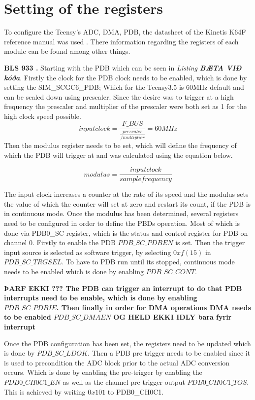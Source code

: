 \chapter{Setting of the registers}\label{sec:codeExplain}
To configure the Teensy's ADC, DMA, PDB, the datasheet of the Kinetis K64F reference manual was used \cite{freescale_semiconductor_kinetis_2021}.
There information regarding the registers of each module can be found among other things.

\textbf{BLS 933 \cite{freescale_semiconductor_kinetis_2021}.}
Starting with the PDB  which can be seen in \textit{Listing \textbf{BÆTA VIÐ kóða}}.
Firstly the clock for the PDB clock needs to be enabled, which is done by setting the SIM\_SCGC6\_PDB;
Which for the Teensy3.5 is 60MHz default and can be scaled down using prescaler.
Since the desire was to trigger at a high frequency the prescaler and multiplier of the prescaler were both set as 1 for the high clock speed possible.
\textbf{$$input clock = \frac{F\_BUS}{\frac{prescaler}{/multiplier}} = 60MHz$$}
Then the modulus register needs to be set, which will define the frequency of which the PDB will trigger at and was calculated using the equation below.

$$modulus = \frac{input clock}{sample frequency}$$

The input clock increases a counter at the rate of its speed and the modulus sets the value of which the counter will set at zero and restart its count, if the PDB is in continuous mode.
Once the modulus has been determined, several registers need to be configured in order to define the PBDs operation.
Most of which is done via PDB0\_SC register, which is the status and control register for PDB on channel 0.
Firstly to enable the PDB $ PDB\_SC\_PDBEN $ is set.
Then the trigger input source is selected as software trigger, by selecting $0xf (15)$ in $ PDB\_SC\_TRGSEL $.
To have to PDB run until its stopped, continuous mode needs to be enabled which is done by enabling $ PDB\_SC\_CONT $.

\textbf{ÞARF EKKI ???
The PDB can trigger an interrupt to do that PDB interrupts need to be enable, which is done by enabling
$ PDB\_SC\_PDBIE $.
Then finally in order for DMA operations DMA needs to be enabled
$ PDB\_SC\_DMAEN$} 
\textbf{OG HELD EKKI IDLY bara fyrir interrupt}

Once the PDB configuration has been set, the registers need to be updated which is done by $ PDB\_SC\_LDOK$.
Then a PDB pre trigger needs to be enabled since it is used to precondition the ADC block prior to the actual ADC conversion occurs.
Which is done by enabling the pre-trigger by enabling the $PDB0\_CH0C1\_EN$ as well as the channel pre trigger output $PDB0\_CH0C1\_TOS$.
This is achieved by writing $0x101$ to PDB0\_CH0C1.

